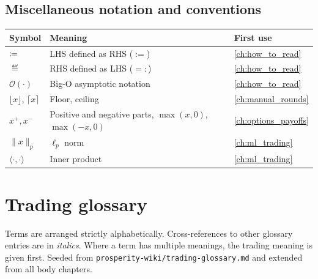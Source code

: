 \subsection{Miscellaneous notation and conventions}

\begin{longtable}{@{}l >{\raggedright\arraybackslash}p{} l@{}}
\toprule
\textbf{Symbol} & \textbf{Meaning} & \textbf{First use} \\
\midrule
\endhead
$\coloneqq$ & LHS defined as RHS ($:=$) & \cref{ch:how_to_read} \\
$\eqdef$ & RHS defined as LHS ($=:$) & \cref{ch:how_to_read} \\
$\mathcal{O}(\cdot)$ & Big-O asymptotic notation & \cref{ch:how_to_read} \\
$\lfloor x\rfloor$, $\lceil x\rceil$ & Floor, ceiling & \cref{ch:manual_rounds} \\
$x^+, x^-$ & Positive and negative parts, $\max(x,0)$, $\max(-x,0)$ & \cref{ch:options_payoffs} \\
$\|x\|_p$ & $\ell_p$ norm & \cref{ch:ml_trading} \\
$\langle\cdot,\cdot\rangle$ & Inner product & \cref{ch:ml_trading} \\
\bottomrule
\end{longtable}

\section{Trading glossary}
\label{sec:app_glossary}

Terms are arranged strictly alphabetically. Cross-references to other
glossary entries are in \emph{italics}. Where a term has multiple
meanings, the trading meaning is given first. Seeded from
\texttt{prosperity-wiki/trading-glossary.md} and extended from all body
chapters.

